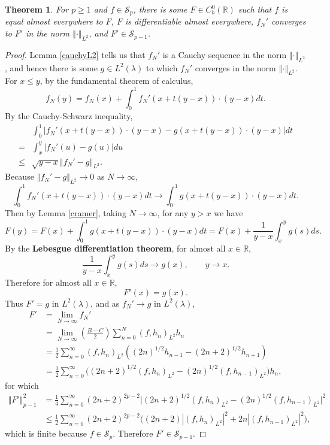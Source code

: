 \documentclass{article}
\newcommand{\norm}[1]{\left\Vert #1 \right\Vert}
\newtheorem{theorem}{Theorem}
\theoremstyle{definition}
\begin{document}
\begin{theorem}
For $p \geq 1$ and $f \in \mathscr{S}_p$,
there is some $F \in C_b^0(\mathbb{R})$
such that $f$ is equal almost everywhere to $F$, 
$F$ is differentiable almost everywhere,
$f_N'$ converges to $F'$ in the norm
$\norm{\cdot}_{L^2}$, and    
 $F' \in \mathscr{S}_{p-1}$. 
\end{theorem}
\begin{proof}
Lemma \ref{cauchyL2} tells us that $f_N'$ is a Cauchy sequence in the norm $\norm{\cdot}_{L^2}$, and
hence there is some $g \in L^2(\lambda)$ to which $f_N'$ converges in
 the norm $\norm{\cdot}_{L^2}$. 
For $x \leq y$, by the fundamental theorem of calculus,
\[
f_N(y) = f_N(x) + \int_0^1 f_N'(x+t(y-x))\cdot (y-x) dt.
\]
By the Cauchy-Schwarz inequality,
\[
\begin{split}
&\int_0^1|f_N'(x+t(y-x))\cdot (y-x)-g(x+t(y-x))\cdot (y-x)| dt\\
=&\int_x^y |f_N'(u)-g(u)| du\\
\leq&\sqrt{y-x} \norm{f_N'-g}_{L^2}.
\end{split}
\]
Because $\norm{f_N'-g}_{L^2} \to 0$ as $N \to \infty$,
\[
\int_0^1f_N'(x+t(y-x))\cdot (y-x) dt
\to \int_0^1 g(x+t(y-x))\cdot (y-x) dt.
\]
Then by Lemma \ref{cramer}, taking $N \to \infty$, for any $y>x$ we have
\[
F(y)=F(x)+\int_0^1 g(x+t(y-x))\cdot (y-x) dt = F(x) + \frac{1}{y-x} \int_x^y g(s) ds.
\]
By the \textbf{Lebesgue differentiation theorem},
for almost all $x \in \mathbb{R}$,
\[
\frac{1}{y-x} \int_x^y g(s) ds \to g(x),\qquad y \to x.
\]
Therefore for almost all $x \in \mathbb{R}$,
\[
F'(x) = g(x).
\]
Thus $F'=g$ in $L^2(\lambda)$,
and as $f_N' \to g$ in $L^2(\lambda)$,
\begin{align*}
F' &= \lim_{N \to \infty} f_N' \\
&= \lim_{N \to \infty} \left(\frac{B-C}{2}\right)
\sum_{n=0}^N (f,h_n)_{L^2} h_n\\
&= \frac{1}{2}\sum_{n=0}^\infty  (f,h_n)_{L^2} ((2n)^{1/2}h_{n-1}-(2n+2)^{1/2}h_{n+1})\\
&= \frac{1}{2}\sum_{n=0}^\infty \bigg( (2n+2)^{1/2} (f,h_n)_{L^2}-(2n)^{1/2} (f,h_{n-1})_{L^2}\bigg) h_n,
\end{align*}
for which
\begin{align*}
\norm{F'}_{p-1}^2&=\frac{1}{4} \sum_{n=0}^\infty (2n+2)^{2p-2} \bigg| (2n+2)^{1/2} (f,h_n)_{L^2}-(2n)^{1/2} (f,h_{n-1})_{L^2}\bigg|^2\\
&\leq \frac{1}{2} \sum_{n=0}^\infty (2n+2)^{2p-2}\bigg((2n+2) |(f,h_n)_{L^2}|^2+2n |(f,h_{n-1})_{L^2}|^2\bigg),
\end{align*}
which is finite because $f \in \mathscr{S}_p$. Therefore $F' \in \mathscr{S}_{p-1}$. 
\end{proof}
\end{document}
